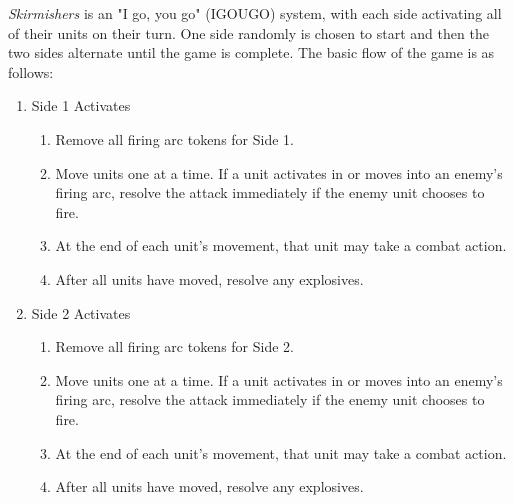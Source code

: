 \emph{Skirmishers} is an "I go, you go" (IGOUGO) system, with each side activating all of their units on their turn.
One side randomly is chosen to start and then the two sides alternate until the game is complete.
The basic flow of the game is as follows:

\begin{enumerate}

  \item Side 1 Activates

  \begin{enumerate}

    \item Remove all firing arc tokens for Side 1.

    \item Move units one at a time.
       If a unit activates in or moves into an enemy's firing arc, resolve the attack immediately if the enemy unit chooses to fire.

    \item At the end of each unit's movement, that unit may take a combat action.

    \item After all units have moved, resolve any explosives.

  \end{enumerate}

  \item Side 2 Activates

  \begin{enumerate}

    \item Remove all firing arc tokens for Side 2.

    \item Move units one at a time.
       If a unit activates in or moves into an enemy's firing arc, resolve the attack immediately if the enemy unit chooses to fire.

    \item At the end of each unit's movement, that unit may take a combat action.

    \item After all units have moved, resolve any explosives.

  \end{enumerate}

\end{enumerate}

